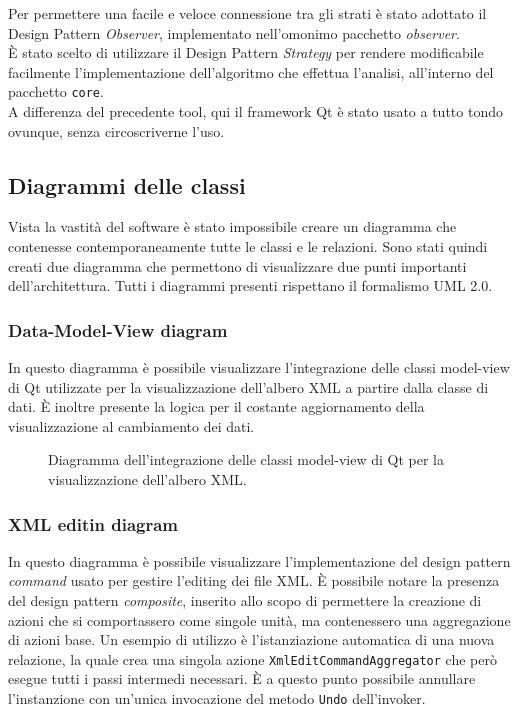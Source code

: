 	Per permettere una facile e veloce connessione tra gli strati è stato adottato il Design Pattern \textit{Observer}, implementato nell'omonimo pacchetto \textit{observer}.\\
	
	È stato scelto di utilizzare il Design Pattern \textit{Strategy} per rendere modificabile facilmente l'implementazione dell'algoritmo che effettua l'analisi, all'interno del pacchetto \texttt{core}.\\
	
	A differenza del precedente tool, qui il framework Qt è stato usato a tutto tondo ovunque, senza circoscriverne l'uso.

	\subsection{Diagrammi delle classi}
		Vista la vastità del software è stato impossibile creare un diagramma che contenesse contemporaneamente tutte le classi e le relazioni. Sono stati quindi creati due diagramma che permettono di visualizzare due punti importanti dell'architettura. Tutti i diagrammi presenti rispettano il formalismo UML 2.0.
		
		\subsubsection{Data-Model-View diagram}
			In questo diagramma è possibile visualizzare l'integrazione delle classi model-view di Qt utilizzate per la visualizzazione dell'albero XML a partire dalla classe di dati. È inoltre presente la logica per il costante aggiornamento della visualizzazione al cambiamento dei dati.
		
		\begin{figure}[!h] 
			\centering 
			\caption{Diagramma dell'integrazione delle classi model-view di Qt per la visualizzazione dell'albero XML.}
		\end{figure}
		
		\subsubsection{XML editin diagram}
		In questo diagramma è possibile visualizzare l'implementazione del design pattern \textit{command} usato per gestire l'editing dei file XML. È possibile notare la presenza del design pattern \textit{composite}, inserito allo scopo di permettere la creazione di azioni che si comportassero come singole unità, ma contenessero una aggregazione di azioni base. Un esempio di utilizzo è l'istanziazione automatica di una nuova relazione, la quale crea una singola azione \texttt{XmlEditCommandAggregator} che però esegue tutti i passi intermedi necessari. È a questo punto possibile annullare l'instanzione con un'unica invocazione del metodo \texttt{Undo} dell'invoker.
		
